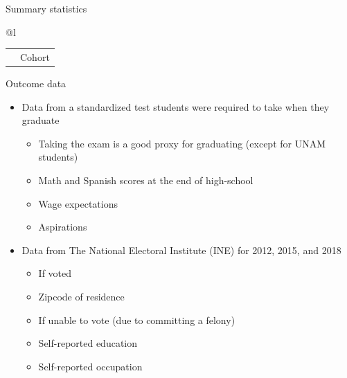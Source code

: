 \documentclass[notes,11pt, aspectratio=169]{beamer}
\begin{document}
\begin{frame}{Summary statistics}
\begin{table}[H]
\centering
\begin{adjustbox}{totalheight=0.9\textheight}
\begin{threeparttable}
\centering
\begin{tabular}[t]{@{}l}
\toprule
\begin{tabular}[t]{lcccccc}
&	\multicolumn{6}{c}{Cohort} \\
 \cmidrule(lr){2-7}

\end{tabular}
\tabularnewline \bottomrule
\end{tabular}
\end{threeparttable}
\end{adjustbox}
\end{table}
\end{frame}

\begin{frame}{Outcome data}
  \begin{itemize}
    \vfill\item Data from a standardized test students were required to take when they graduate
  \begin{itemize}
  \vfill\item Taking the exam is a good proxy for graduating (except for UNAM students)
    \vfill\item Math and Spanish scores at the end of high-school
    \vfill\item Wage expectations
    \vfill\item Aspirations
      \end{itemize}

    \vfill\item Data from The National Electoral Institute (INE) for 2012, 2015, and 2018
      \begin{itemize}
    \vfill\item If voted 
    \vfill\item Zipcode of residence 
    \vfill\item If unable to vote (due to committing a felony)
    \vfill\item Self-reported education
    \vfill\item Self-reported occupation
      \end{itemize}
  \end{itemize}
\end{frame}
\end{document}
